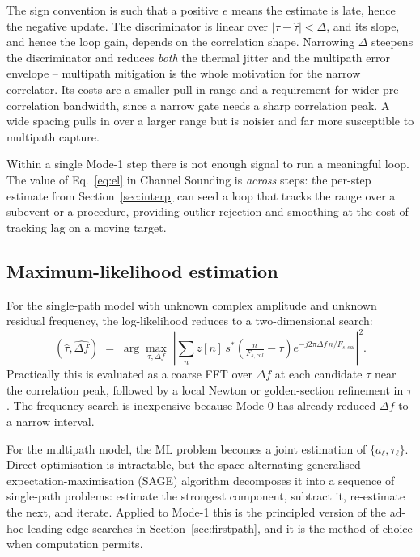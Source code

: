 \documentclass[11pt,a4paper]{article}
\begin{document}
The sign convention is such that a positive $e$ means the estimate is late, hence the negative
update. The discriminator is linear over $|\tau - \hat\tau| < \Delta$, and its slope, and hence the
loop gain, depends on the correlation shape. Narrowing $\Delta$ steepens the discriminator and
reduces \emph{both} the thermal jitter and the multipath error envelope -- multipath mitigation is
the whole motivation for the narrow correlator. Its costs are a smaller pull-in range and a
requirement for wider pre-correlation bandwidth, since a narrow gate needs a sharp correlation peak.
A wide spacing pulls in over a larger range but is noisier and far more susceptible to multipath
capture.

Within a single Mode-1 step there is not enough signal to run a meaningful loop. The value of
Eq.~\eqref{eq:el} in Channel Sounding is \emph{across} steps: the per-step estimate from
Section~\ref{sec:interp} can seed a loop that tracks the range over a subevent or a procedure,
providing outlier rejection and smoothing at the cost of tracking lag on a moving target.

\subsection{Maximum-likelihood estimation}
\label{sec:ml}

For the single-path model with unknown complex amplitude and unknown residual frequency, the
log-likelihood reduces to a two-dimensional search:
\begin{equation}
(\hat\tau, \widehat{\Delta f}) \;=\;
\arg\max_{\tau,\Delta f}\;
\left| \sum_n z[n]\, s^{*}\!\left(\tfrac{n}{F_{s,cal}} - \tau\right) e^{-j2\pi \Delta f\, n / F_{s,cal}} \right|^2 .
\label{eq:ml}
\end{equation}
Practically this is evaluated as a coarse FFT over $\Delta f$ at each candidate $\tau$ near the
correlation peak, followed by a local Newton or golden-section refinement in $\tau$. The frequency
search is inexpensive because Mode-0 has already reduced $\Delta f$ to a narrow interval.

For the multipath model, the ML problem becomes a joint estimation of $\{a_\ell,\tau_\ell\}$. Direct
optimisation is intractable, but the space-alternating generalised expectation-maximisation (SAGE)
algorithm decomposes it into a sequence of single-path problems: estimate the strongest component,
subtract it, re-estimate the next, and iterate. Applied to Mode-1 this is the principled version of
the ad-hoc leading-edge searches in Section~\ref{sec:firstpath}, and it is the method of choice
when computation permits.
\end{document}
